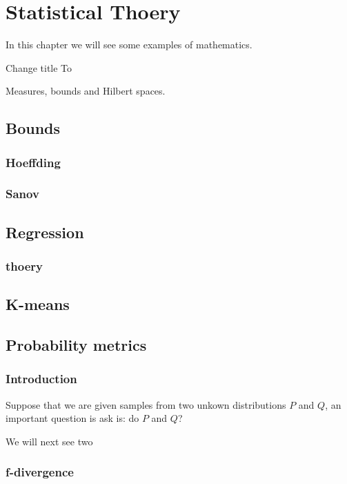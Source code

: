 \chapter{Statistical Thoery}
In this chapter we will see some examples of mathematics.

Change title To

Measures, bounds and Hilbert spaces. 

\lipsum[1]

\section{Bounds}

\subsection{Hoeffding}

\subsection{Sanov}

\section{Regression}

\subsection{thoery}

\section{K-means}


\section{Probability metrics}

\subsection{Introduction}

Suppose that we are given samples from two unkown distributions $P$ and $Q$, an 
important question is ask is: do $P$ and $Q$?

We will next see two 


\subsection{f-divergence}

